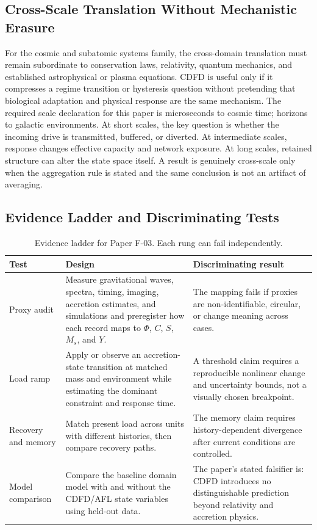 \documentclass[11pt,a4paper]{article}
\begin{document}
\subsection{Cross-Scale Translation Without Mechanistic Erasure}

For the cosmic and subatomic systems family, the cross-domain translation must remain subordinate to conservation laws, relativity, quantum mechanics, and established astrophysical or plasma equations. CDFD is useful only if it compresses a regime transition or hysteresis question without pretending that biological adaptation and physical response are the same mechanism. \cite{Turing1952,Shannon1948,BakTangWiesenfeld1987}
The required scale declaration for this paper is microseconds to cosmic time; horizons to galactic environments. At short
scales, the key question is whether the incoming drive is transmitted,
buffered, or diverted. At intermediate scales, response changes effective
capacity and network exposure. At long scales, retained structure can alter the
state space itself. A result is genuinely cross-scale only when the aggregation
rule is stated and the same conclusion is not an artifact of averaging.

\subsection{Evidence Ladder and Discriminating Tests}

\begin{table}[htbp]
\centering
\small
\caption{Evidence ladder for Paper F-03. Each rung can fail independently.}
\begin{tabularx}{\textwidth}{|p{}|X|X|}
\hline
\textbf{Test} & \textbf{Design} & \textbf{Discriminating result} \\
\hline
Proxy audit & Measure gravitational waves, spectra, timing, imaging, accretion estimates, and simulations and preregister how each record maps to $\Phi$, $C$, $S$, $M_s$, and $Y$. & The mapping fails if proxies are non-identifiable, circular, or change meaning across cases. \\
\hline
Load ramp & Apply or observe an accretion-state transition at matched mass and environment while estimating the dominant constraint and response time. & A threshold claim requires a reproducible nonlinear change and uncertainty bounds, not a visually chosen breakpoint. \\
\hline
Recovery and memory & Match present load across units with different histories, then compare recovery paths. & The memory claim requires history-dependent divergence after current conditions are controlled. \\
\hline
Model comparison & Compare the baseline domain model with and without the CDFD/AFL state variables using held-out data. & The paper's stated falsifier is: CDFD introduces no distinguishable prediction beyond relativity and accretion physics. \\
\hline
\end{tabularx}
\end{table}
\end{document}

